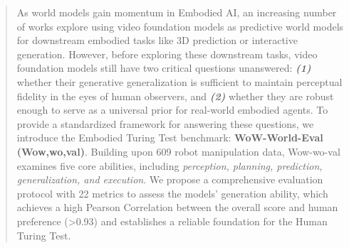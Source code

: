 \begin{abstract}
As world models gain momentum in Embodied AI, an increasing number of works explore using video foundation models as predictive world models for downstream embodied tasks like 3D prediction or interactive generation.
However, before exploring these downstream tasks, video foundation models still have two critical questions unanswered: \textbf{\textit{\footnotesize (1)}} whether their generative generalization is sufficient to maintain perceptual fidelity in the eyes of human observers, and \textbf{\textit{\footnotesize (2)}} whether they are robust enough to serve as a universal prior for real-world embodied agents.
To provide a standardized framework for answering these questions, we introduce the Embodied Turing Test benchmark: \textbf{WoW-World-Eval (Wow,wo,val)}.
Building upon 609 robot manipulation data, Wow-wo-val examines five core abilities, including \textit{perception, planning, prediction, generalization, and execution}. We propose a comprehensive evaluation protocol with 22 metrics to assess the models' generation ability, which achieves a high Pearson Correlation between the overall score and human preference (>0.93) and establishes a reliable foundation for the Human Turing Test.

\end{abstract}
